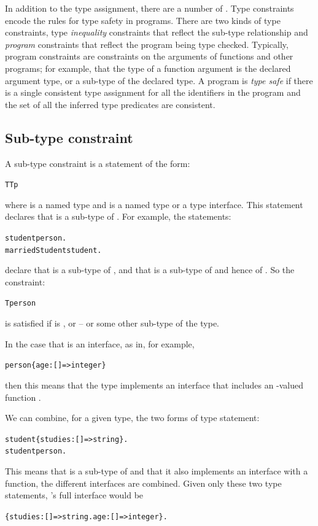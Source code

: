 In addition to the type assignment, there are a number of . Type constraints encode the rules for type safety in programs. There are two kinds of type constraints, type \emph{inequality} constraints that reflect the sub-type relationship and \emph{program} constraints that reflect the program being type checked.
Typically, program constraints are constraints on the arguments of functions and other programs; for example, that the type of a function argument is the declared argument type, or a sub-type of the declared type. A program is \emph{type safe} if there is a single consistent type assignment for all the identifiers in the program and the set of all the inferred type predicates are consistent.

\subsection{Sub-type constraint}
\label{type:subtype}
A sub-type constraint is a statement of the form:
\begin{alltt}
T \impl Tp
\end{alltt}
where  is a named type and  is a named type or a type interface. This statement declares that  is a sub-type of . For example, the statements:
\begin{alltt}
student \impl person.
marriedStudent \impl student.
\end{alltt}
declare that  is a sub-type of , and that  is a sub-type of  and hence of . So the constraint:
\begin{alltt}
T \impl person
\end{alltt}
is satisfied if  is ,  or  -- or some other sub-type of the  type.

In the case that  is an interface, as in, for example,
\begin{alltt}
person \impl \{ age:[]=>integer\}
\end{alltt}
then this means that the  type implements an interface that includes an -valued function .

We can combine, for a given type, the two forms of type statement:
\begin{alltt}
student \impl \{ studies:[]=>string\}.
student \impl person.
\end{alltt}
This means that  is a sub-type of  and that it also implements an interface with a  function, the different interfaces are combined. Given only these two type statements, 's full interface would be
\begin{alltt}
\{ studies:[]=>string. age:[]=>integer\}.
\end{alltt}

